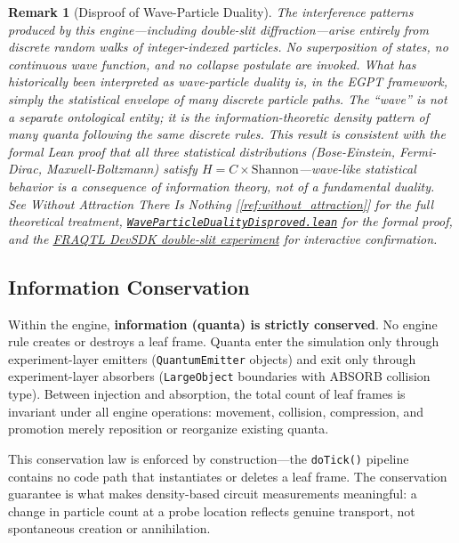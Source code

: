 \documentclass[11pt,a4paper]{article}
\newtheorem{remark}[theorem]{Remark}
\begin{document}
\begin{remark}[Disproof of Wave-Particle Duality]
The interference patterns produced by this engine---including double-slit diffraction---arise entirely from discrete random walks of integer-indexed particles. No superposition of states, no continuous wave function, and no collapse postulate are invoked. What has historically been interpreted as wave-particle duality is, in the EGPT framework, simply the statistical envelope of many discrete particle paths. The ``wave'' is not a separate ontological entity; it is the information-theoretic density pattern of many quanta following the same discrete rules. This result is consistent with the formal Lean proof that all three statistical distributions (Bose-Einstein, Fermi-Dirac, Maxwell-Boltzmann) satisfy $H = C \times \text{Shannon}$---wave-like statistical behavior is a consequence of information theory, not of a fundamental duality. See \emph{Without Attraction There Is Nothing} [\ref{ref:without_attraction}] for the full theoretical treatment, \href{https://eabadir.github.io/EGPT/Lean/PPNP/Proofs/WaveParticleDualityDisproved.lean}{\texttt{WaveParticleDualityDisproved.lean}} for the formal proof, and the \href{https://eabadir.github.io/EGPT/www/fraqtl_devsdk/index.html}{FRAQTL DevSDK double-slit experiment} for interactive confirmation.
\end{remark}

\subsection{Information Conservation}
\label{subsec:conservation}

Within the engine, \textbf{information (quanta) is strictly conserved}. No engine rule creates or destroys a leaf frame. Quanta enter the simulation only through experiment-layer emitters (\texttt{QuantumEmitter} objects) and exit only through experiment-layer absorbers (\texttt{LargeObject} boundaries with ABSORB collision type). Between injection and absorption, the total count of leaf frames is invariant under all engine operations: movement, collision, compression, and promotion merely reposition or reorganize existing quanta.

This conservation law is enforced by construction---the \texttt{doTick()} pipeline contains no code path that instantiates or deletes a leaf frame. The conservation guarantee is what makes density-based circuit measurements meaningful: a change in particle count at a probe location reflects genuine transport, not spontaneous creation or annihilation.
\end{document}
